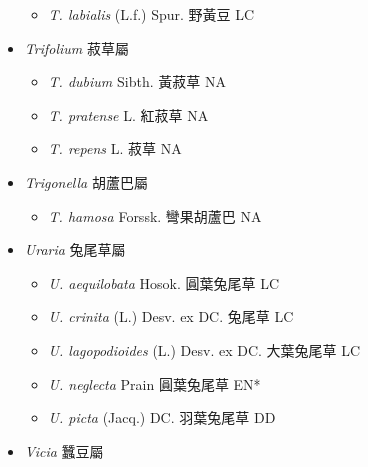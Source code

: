 \begin{itemize}
  \begin{itemize}
        \item[] \textit{T. labialis} (L.f.) Spur.  野黃豆   LC
  \end{itemize}
 \item[] \textit{Trifolium} 菽草屬
                                
  \begin{itemize}
        \item[] \textit{T. dubium} Sibth.  黃菽草   NA
        \item[] \textit{T. pratense} L.  紅菽草   NA
        \item[] \textit{T. repens} L.  菽草   NA
  \end{itemize}
 \item[] \textit{Trigonella} 胡蘆巴屬
                                
  \begin{itemize}
        \item[] \textit{T. hamosa} Forssk.  彎果胡蘆巴   NA
  \end{itemize}
 \item[] \textit{Uraria} 兔尾草屬
                                
  \begin{itemize}
        \item[] \textit{U. aequilobata} Hosok.  圓葉兔尾草   LC
        \item[] \textit{U. crinita} (L.) Desv. ex DC.  兔尾草   LC
        \item[] \textit{U. lagopodioides} (L.) Desv. ex DC.  大葉兔尾草   LC
        \item[] \textit{U. neglecta} Prain  圓葉兔尾草   EN*
        \item[] \textit{U. picta} (Jacq.) DC.  羽葉兔尾草   DD
  \end{itemize}
 \item[] \textit{Vicia} 蠶豆屬
                                

\end{itemize}
